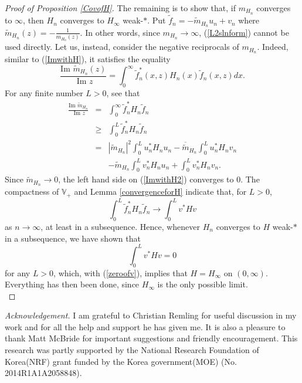\documentclass[preprint,12pt]{elsarticle}
\newcommand{\V}{{\mathbb V}}
\begin{document}
\begin{proof}[Proof of Proposition \ref{CovofH}]
The remaining is to show that, if $m_{H_n}$ converges to $\infty$,  then $H_n$ converges to $H_{\infty}$ weak-$*$. Put $\tilde{f}_n=-\tilde{m}_{H_n}u_n+v_n$ where $\tilde{m}_{H_n}(z)=-\frac1{m_{H_n}(z)}$. In other words, since $m_{H_n}\to\infty$, (\ref{L2slnform}) cannot be used directly. Let us, instead, consider the negative reciprocals of $m_{H_n}$. Indeed, similar to (\ref{ImwithH}), it satisfies the equality 
\begin{equation}
\label{ImwithH2}
\frac{\textrm{Im }\tilde{m}_{H_n}(z)}{\textrm{ Im }z}=\int_0^{\infty}\tilde{f}^*_n(x,z)H_n(x)\tilde{f}_n(x,z)dx.
\end{equation}
For any finite number $L>0$, see that 
\begin{eqnarray*}
\frac{\textrm{Im }\tilde{m}_{H_n}}{\textrm{ Im }z} 
&=& \int_0^{\infty}\tilde{f}_n^* H_n\tilde{f}_n\\
&\ge& \int_0^{L}\tilde{f}_n^* H_n\tilde{f}_n\\
&=& |\tilde{m}_{H_n}|^2\int_0^{L} u_n^* H_n u_n-\overline{\tilde{m}}_{H_n}\int_0^{L} u_n^* H_n v_n\\
&& -\tilde{m}_{H_n}\int_0^{L} v_n^* H_n u_n+\int_0^{L} v_n^* H_n v_n.
\end{eqnarray*}
Since $\tilde{m}_{H_n} \to 0$, the left hand side on (\ref{ImwithH2}) converges to $0$. The compactness of $\V_+$ and Lemma \ref{convergenceforH} indicate that, for $L>0$, 
\begin{equation*}
\int_0^{L}\tilde{f}^*_n H_n\tilde{f}_n \rightarrow \int_0^L v^*Hv
\end{equation*} 
as $n\to \infty$, at least in a subsequence. Hence, whenever $H_n$ converges to $H$ weak-$*$ in a subsequence, we have shown that 
\begin{equation*}
\int_0^L v^*Hv=0
\end{equation*}
for any $L>0$, which, with (\ref{zeroofv}), implies that $H=H_{\infty}$ on $(0,\infty)$. Everything has then been done, since $H_{\infty}$ is the only possible limit.\\ 
\end{proof}

\textit{Acknowledgement.} I am grateful to Christian Remling for useful discussion in my  work and for all the help and support he has given me. It is also a pleasure to thank Matt McBride for important suggestions and friendly encouragement.  This research was partly supported by the National Research Foundation of Korea(NRF) grant funded by the Korea government(MOE) (No. 2014R1A1A2058848).\\ 
\end{document}
